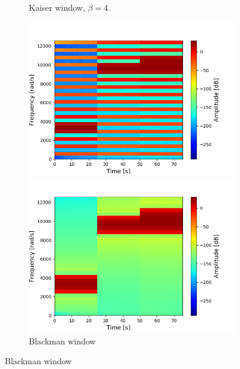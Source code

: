 \begin{figure}[H]
\begin{subfigure}{0.49\textwidth}
\caption{Kaiser window, $\beta=4$.}
\label{fig:stft_kaiser_100_4}
\end{subfigure}
\begin{subfigure}{0.49\textwidth}
\centering
\includegraphics[width=\textwidth]{figures/stft_windows/100/bartlett.png}
\caption{Bartlett window}
\label{fig:stft_bartlett_100}
\includegraphics[width=\textwidth]{figures/stft_windows/100/blackman.png}
\caption{Blackman window}
\label{fig:stft_blackman_100}

\end{subfigure}
\end{figure}
